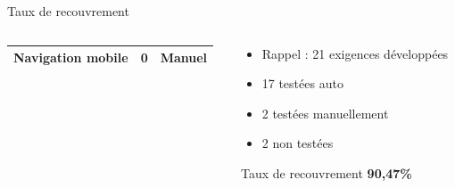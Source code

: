 \documentclass{beamer}
\begin{document}
\begin{frame}
\begin{block}{Taux de recouvrement}
\begin{columns}
\begin{column}{.6\textwidth}
\begin{center}
{\begin{tabular}{|l|cc|}
                    Navigation mobile	& 0 &	Manuel  \\
                    \hline
                  \end{tabular}
                }
              \end{center}
            \end{column}
            \begin{column}{.4\textwidth}
              \begin{itemize}
                \item {\scriptsize Rappel : 21 exigences développées}
                \item {\scriptsize 17 testées auto}
                \item {\scriptsize 2 testées manuellement}
                \item {\scriptsize 2 non testées}
              \end{itemize}
              Taux de recouvrement \textbf{90,47\%}
            \end{column}
          \end{columns}
        \end{block}
      \end{frame}
\end{document}
